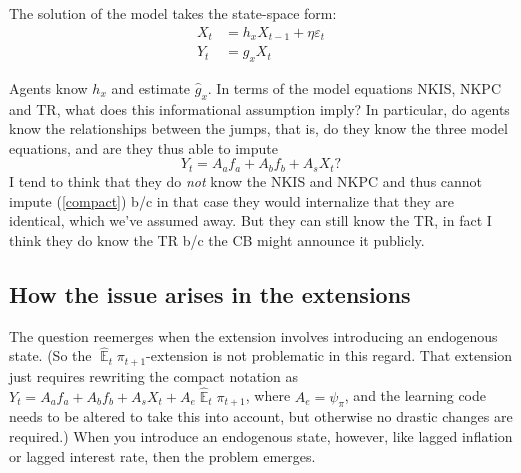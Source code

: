 \documentclass[11pt]{article}
\renewcommand{\[}{\begin{equation}}
\renewcommand{\]}{\end{equation}}
\DeclareMathOperator{\E}{\mathbb{E}}
\begin{document}
The solution of the model takes the state-space form:
\begin{align}
X_t & = h_x X_{t-1} + \eta \varepsilon_t \label{state_eq}\\
Y_t & = g_x X_t \label{obs_eq}
\end{align}

Agents know $h_x$ and estimate $\hat{g}_x$. In terms of the model equations NKIS, NKPC and TR, what does this informational assumption imply? In particular, do agents know the relationships between the jumps, that is, do they know the three model equations, and are they thus able to impute
\begin{equation}
Y_t = A_a f_a + A_b f_b + A_s X_t ? \label{compact}
\end{equation}
I tend to think that they do \emph{not} know the NKIS and NKPC and thus cannot impute (\ref{compact}) b/c in that case they would internalize that they are identical, which we've assumed away. But they can still know the TR, in fact I think they do know the TR b/c the CB might announce it publicly.
\subsection{How the issue arises in the extensions }
The question reemerges when the extension involves introducing an endogenous state. (So the $\hat{\E}_t\pi_{t+1}$-extension is not problematic in this regard. That extension just requires rewriting the compact notation as $Y_t = A_a f_a + A_b f_b + A_s X_t +A_e\hat{\E}_t\pi_{t+1}$, where $A_e = \psi_{\pi}$, and the learning code needs to be altered to take this into account, but otherwise no drastic changes are required.)
When you introduce an endogenous state, however, like lagged inflation or lagged interest rate, then the problem emerges. 
\end{document}
